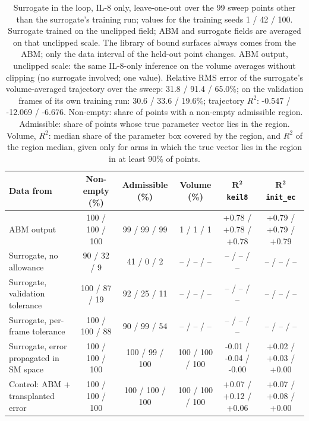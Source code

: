 \begin{table}[!htbp]
\caption{Surrogate in the loop, IL-8 only, leave-one-out over the 99 sweep points other than the surrogate's training run; values for the training seeds 1 / 42 / 100. Surrogate trained on the unclipped field; ABM and surrogate fields are averaged on that unclipped scale. The library of bound surfaces always comes from the ABM; only the data interval of the held-out point changes. ABM output, unclipped scale: the same IL-8-only inference on the volume averages without clipping (no surrogate involved; one value). Relative RMS error of the surrogate's volume-averaged trajectory over the sweep: 31.8 / 91.4 / 65.0\%; on the validation frames of its own training run: 30.6 / 33.6 / 19.6\%; trajectory $R^2$: -0.547 / -12.069 / -6.676. Non-empty: share of points with a non-empty admissible region. Admissible: share of points whose true parameter vector lies in the region. Volume, $R^2$: median share of the parameter box covered by the region, and $R^2$ of the region median, given only for arms in which the true vector lies in the region in at least 90\% of points.}
\label{tab:loop_unclipped}
\centering\footnotesize
\setlength{\tabcolsep}{4pt}
\begin{tabular}{lccccc}
\toprule
\textbf{Data from} & \textbf{Non-empty (\%)} & \textbf{Admissible (\%)} & \textbf{Volume (\%)} & $\mathbf{R^2}$ \texttt{keil8} & $\mathbf{R^2}$ \texttt{init\_ec} \\
\midrule
ABM output & 100 / 100 / 100 & 99 / 99 / 99 & 1 / 1 / 1 & +0.78 / +0.78 / +0.78 & +0.79 / +0.79 / +0.79 \\
Surrogate, no allowance & 90 / 32 / 9 & 41 / 0 / 2 & -- / -- / -- & -- / -- / -- & -- / -- / -- \\
Surrogate, validation tolerance & 100 / 87 / 19 & 92 / 25 / 11 & -- / -- / -- & -- / -- / -- & -- / -- / -- \\
Surrogate, per-frame tolerance & 100 / 100 / 88 & 90 / 99 / 54 & -- / -- / -- & -- / -- / -- & -- / -- / -- \\
Surrogate, error propagated in SM space & 100 / 100 / 100 & 100 / 99 / 100 & 100 / 100 / 100 & -0.01 / -0.04 / -0.00 & +0.02 / +0.03 / +0.00 \\
Control: ABM + transplanted error & 100 / 100 / 100 & 100 / 100 / 100 & 100 / 100 / 100 & +0.07 / +0.12 / +0.06 & +0.07 / +0.08 / +0.00 \\
\bottomrule
\end{tabular}
\end{table}
